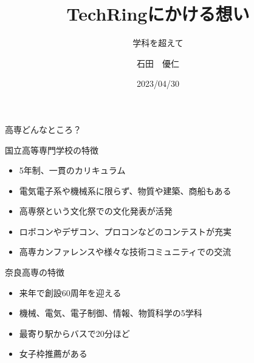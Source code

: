 \documentclass[dvipdfmx]{beamer}
\title{TechRingにかける想い}
\subtitle{学科を超えて}
\author[Jin]{石田　優仁}
\institute[TechRing]{奈良高専TechRing}
\date[2023/04/30]{2023/04/30}
\begin{document}
\maketitle

\begin{frame}{高専どんなところ？}

  \begin{block}{国立高等専門学校の特徴}
    \begin{itemize}
      \setlength{\itemsep}{1mm}
      \item 5年制、一貫のカリキュラム
      \item 電気電子系や機械系に限らず、物質や建築、商船もある
      \item 高専祭という文化祭での文化発表が活発
      \item ロボコンやデザコン、プロコンなどのコンテストが充実
      \item 高専カンファレンスや様々な技術コミュニティでの交流
    \end{itemize}
  \end{block}

  \begin{alertblock}{奈良高専の特徴}
      \begin{itemize}
        \setlength{\itemsep}{1mm}
        \item 来年で創設60周年を迎える
        \item 機械、電気、電子制御、情報、物質科学の5学科
        \item 最寄り駅からバスで20分ほど
        \item 女子枠推薦がある
      \end{itemize}
  \end{alertblock}

\end{frame}
\end{document}
